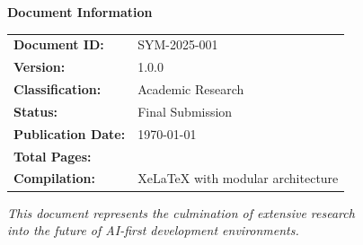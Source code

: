 \vspace{2cm}

\begin{center}
\begin{tcolorbox}[
    enhanced,
    colback=white,
    colframe=brandPrimary!40,
    boxrule=1pt,
    arc=8pt,
    left=1.5cm,
    right=1.5cm,
    top=1cm,
    bottom=1cm
]
\begin{center}
{\textbf{\textcolor{brandPrimary}{Document Information}}}
\end{center}

\vspace{0.5cm}

\begin{tabular}{@{}ll@{}}
\textbf{Document ID:} & SYM-2025-001 \\
\textbf{Version:} & 1.0.0 \\
\textbf{Classification:} & Academic Research \\
\textbf{Status:} & Final Submission \\
\textbf{Publication Date:} & \today \\
\textbf{Total Pages:} & \pageref{LastPage} \\
\textbf{Compilation:} & XeLaTeX with modular architecture \\
\end{tabular}
\end{tcolorbox}
\end{center}

\vspace{1cm}

\begin{center}
\textit{\textcolor{brandSecondary}{This document represents the culmination of extensive research\\
into the future of AI-first development environments.}}
\end{center}

\clearpage
